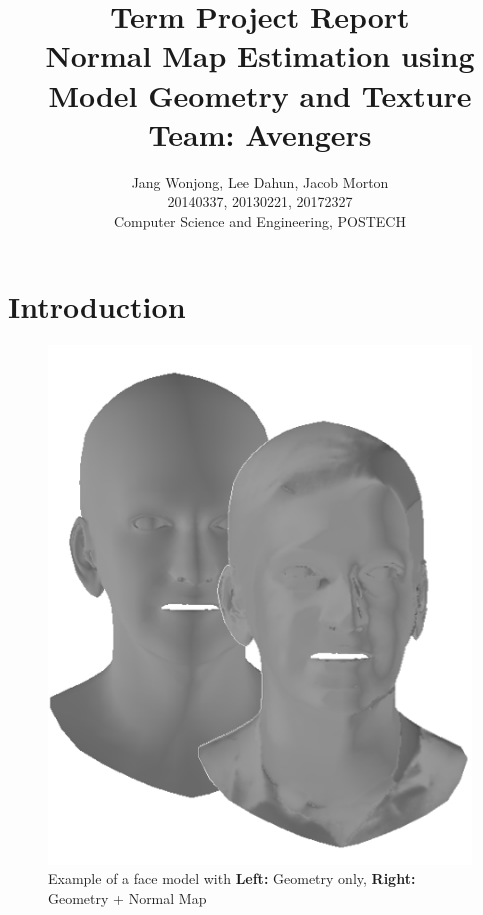 \documentclass[10pt,twocolumn,letterpaper]{article}
\begin{document}
	
\title{Term Project Report \\
Normal Map Estimation using Model Geometry and Texture \\
Team: Avengers }
\author{Jang Wonjong, Lee Dahun, Jacob Morton\\
	20140337, 20130221, 20172327\\
	Computer Science and Engineering, POSTECH\\
	{\tt\small}}

\maketitle

\section{Introduction}
\begin{figure}[t]
	\begin{center}
		\includegraphics [scale=0.5] {image/intro.png}
	\end{center}
	\caption{Example of a face model with \textbf{Left:} Geometry only, \textbf{Right:} Geometry + Normal Map}
	\label{fig:title}
\end{figure} 
\end{document}
